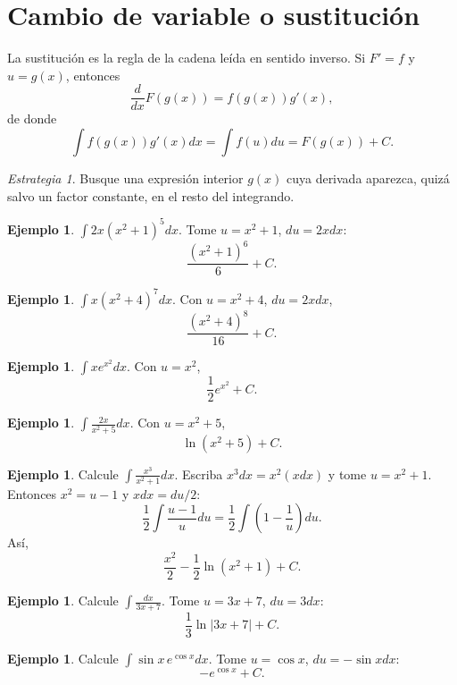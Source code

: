 \documentclass[12pt]{article}
\theoremstyle{definition}\newtheorem{definicion}[teorema]{Definición}\newtheorem{ejemplo}[teorema]{Ejemplo}\newtheorem{ejercicio}[teorema]{Ejercicio}
\theoremstyle{remark}\newtheorem*{observacion}{Observación}\newtheorem*{advertencia}{Advertencia}\newtheorem*{estrategia}{Estrategia}
\begin{document}
\section{Cambio de variable o sustitución}
La sustitución es la regla de la cadena leída en sentido inverso. Si $F'=f$ y $u=g(x)$, entonces
\[\frac{d}{dx}F(g(x))=f(g(x))g'(x),\]
de donde
\[\boxed{\int f(g(x))g'(x)dx=\int f(u)du=F(g(x))+C}.\]
\begin{estrategia}Busque una expresión interior $g(x)$ cuya derivada aparezca, quizá salvo un factor constante, en el resto del integrando.\end{estrategia}
\begin{ejemplo}$\int2x(x^2+1)^5dx$. Tome $u=x^2+1$, $du=2x dx$:
\[\boxed{\frac{(x^2+1)^6}{6}+C}.\]\end{ejemplo}
\begin{ejemplo}$\int x(x^2+4)^7dx$. Con $u=x^2+4$, $du=2x dx$,
\[\boxed{\frac{(x^2+4)^8}{16}+C}.\]\end{ejemplo}
\begin{ejemplo}$\int xe^{x^2}dx$. Con $u=x^2$,
\[\boxed{\frac12e^{x^2}+C}.\]\end{ejemplo}
\begin{ejemplo}$\int\frac{2x}{x^2+5}dx$. Con $u=x^2+5$,
\[\boxed{\ln(x^2+5)+C}.\]\end{ejemplo}
\begin{ejemplo}Calcule $\int\frac{x^3}{x^2+1}dx$. Escriba $x^3dx=x^2(xdx)$ y tome $u=x^2+1$. Entonces $x^2=u-1$ y $x dx=du/2$:
\[\frac12\int\frac{u-1}{u}du=\frac12\int\left(1-\frac1u\right)du.\]
Así,
\[\boxed{\frac{x^2}{2}-\frac12\ln(x^2+1)+C}.\]\end{ejemplo}
\begin{ejemplo}Calcule $\int\frac{dx}{3x+7}$. Tome $u=3x+7$, $du=3dx$:
\[\boxed{\frac13\ln|3x+7|+C}.\]\end{ejemplo}
\begin{ejemplo}Calcule $\int\sin x\,e^{\cos x}dx$. Tome $u=\cos x$, $du=-\sin xdx$:
\[\boxed{-e^{\cos x}+C}.\]\end{ejemplo}
\end{document}
